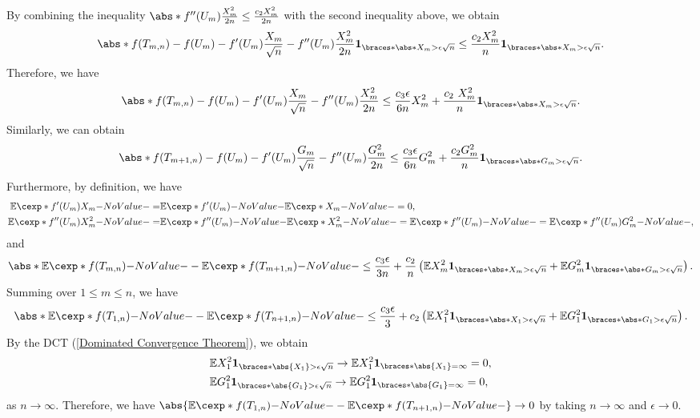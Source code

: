 \documentclass[12pt]{article}
\begin{document}
By combining the inequality $\abs*{f''(U_m)\frac{X_m^2}{2n}} \leq \frac{c_2 X_m^2}{2n}$ with the second inequality above, we obtain
\begin{align*}
\abs*{f(T_{m,n}) - f(U_m) - f'(U_m)\frac{X_m}{\sqrt{n}} - f''(U_m)\frac{X_m^2}{2n}} \indicator{\abs*{X_m} > \epsilon \sqrt{n}}
\leq
\frac{c_2 X_m^2}{n} \indicator{\abs*{X_m} > \epsilon \sqrt{n}}.
\end{align*}
Therefore, we have
\begin{align*}
\abs*{f(T_{m,n}) - f(U_m) - f'(U_m)\frac{X_m}{\sqrt{n}} - f''(U_m)\frac{X_m^2}{2n}}
\leq
\frac{c_3\epsilon}{6n}X_m^2 + \frac{c_2\ X_m^2}{n} \indicator{\abs*{X_m} > \epsilon \sqrt{n}}.
\end{align*}
Similarly, we can obtain
\begin{align*}
\abs*{f(T_{m+1,n}) - f(U_m) - f'(U_m)\frac{G_m}{\sqrt{n}} - f''(U_m)\frac{G_m^2}{2n}}
\leq
\frac{c_3\epsilon}{6n}G_m^2 + \frac{c_2 G_m^2}{n} \indicator{\abs*{G_m} > \epsilon \sqrt{n}}.
\end{align*}
Furthermore,  by definition, we have
\begin{align*}
\E[f'(U_m)X_m] =& \E[f'(U_m)] \E[X_m] = 0, \\
\E[f''(U_m)X_m^2] =& \E[f''(U_m)] \E[X_m^2] = \E[f''(U_m)] = \E[f''(U_m)G_m^2],
\end{align*}
and
\begin{align*}
\abs*{ \E[f(T_{m,n})] - \E[f(T_{m+1,n})] } 
\leq
\frac{c_3\epsilon}{3n} + \frac{c_2}{n} \left( \E X_m^2 \indicator{\abs*{X_m} > \epsilon \sqrt{n}} +  \E G_m^2 \indicator{\abs*{G_m} > \epsilon \sqrt{n}} \right).
\end{align*}
Summing over $1\leq m \leq n$, we have
\begin{align*}
\abs*{\E[f(T_{1,n})] - \E[f(T_{n+1,n})]}
\leq
\frac{c_3\epsilon}{3} + c_2\left( \E X_1^2 \indicator{\abs*{X_1} > \epsilon \sqrt{n}} +  \E G_1^2 \indicator{\abs*{G_1} > \epsilon \sqrt{n}} \right).
\end{align*}
By the DCT (\cref{Dominated Convergence Theorem}), we obtain
\begin{align*}
&\E X_1^2 \indicator{\abs{X_1} > \epsilon \sqrt{n}} \to \E X_1^2 \indicator{\abs{X_1} = \infty} =0,\\
&\E G_1^2 \indicator{\abs{G_1} > \epsilon \sqrt{n}} \to \E G_1^2 \indicator{\abs{G_1} = \infty} =0,
\end{align*}
as $n \to \infty$. Therefore, we have $\abs{\E[f(T_{1,n})] - \E[f(T_{n+1,n})]}\to 0$ by taking $n\to\infty$ and $\epsilon\to0$.
\end{document}
